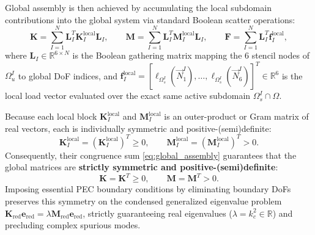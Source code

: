\documentclass[VANCOUVER,Times1COL]{WileyNJD-v5}
\begin{document}
Global assembly is then achieved by accumulating the local subdomain contributions into the global system via standard Boolean scatter operations:
\begin{equation}
    \mathbf{K} = \sum_{I=1}^N \mathbf{L}_I^T \mathbf{K}_I^{\mathrm{local}} \mathbf{L}_I, \qquad \mathbf{M} = \sum_{I=1}^N \mathbf{L}_I^T \mathbf{M}_I^{\mathrm{local}} \mathbf{L}_I, \qquad \mathbf{F} = \sum_{I=1}^N \mathbf{L}_I^T \mathbf{f}_I^{\mathrm{local}},
    \label{eq:global_assembly}
\end{equation}
where $\mathbf{L}_I \in \mathbb{R}^{6 \times N}$ is the Boolean gathering matrix mapping the 6 stencil nodes of $\Omega_u^I$ to global DoF indices, and $\mathbf{f}_I^{\mathrm{local}} = [\ell_{\Omega_s^I}(\vec{N}_1^I), \dots, \ell_{\Omega_s^I}(\vec{N}_6^I)]^T \in \mathbb{R}^6$ is the local load vector evaluated over the exact same active subdomain $\Omega_s^I \cap \Omega$.

Because each local block $\mathbf{K}_I^{\mathrm{local}}$ and $\mathbf{M}_I^{\mathrm{local}}$ is an outer-product or Gram matrix of real vectors, each is individually symmetric and positive-(semi)definite:
\begin{equation}
    \mathbf{K}_I^{\mathrm{local}} = (\mathbf{K}_I^{\mathrm{local}})^T \ge 0, \qquad \mathbf{M}_I^{\mathrm{local}} = (\mathbf{M}_I^{\mathrm{local}})^T > 0.
\end{equation}
Consequently, their congruence sum \eqref{eq:global_assembly} guarantees that the global matrices are \textbf{strictly symmetric and positive-(semi)definite}:
\begin{equation}
    \mathbf{K} = \mathbf{K}^T \ge 0, \qquad \mathbf{M} = \mathbf{M}^T > 0.
    \label{eq:symmetric_global_properties}
\end{equation}
Imposing essential PEC boundary conditions by eliminating boundary DoFs preserves this symmetry on the condensed generalized eigenvalue problem $\mathbf{K}_{\mathrm{red}} \mathbf{e}_{\mathrm{red}} = \lambda \mathbf{M}_{\mathrm{red}} \mathbf{e}_{\mathrm{red}}$, strictly guaranteeing real eigenvalues ($\lambda = k_c^2 \in \mathbb{R}$) and precluding complex spurious modes.
\end{document}
